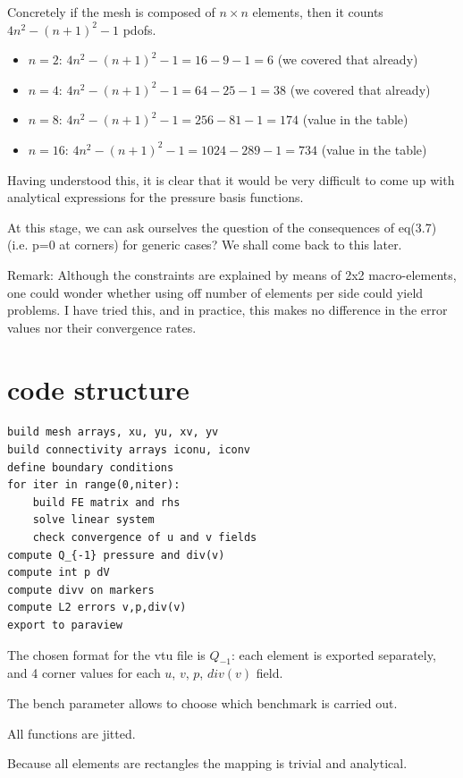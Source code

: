 Concretely if the mesh is composed of $n \times n$ elements, then it 
counts $4n^2 - (n+1)^2  -1$ pdofs.
\begin{itemize}
\item $n=2$:  $4n^2 - (n+1)^2 -1= 16 -9 -1=6 $ (we covered that already)
\item $n=4$:  $4n^2 - (n+1)^2 -1= 64 -25 -1=38 $ (we covered that already)
\item $n=8$:  $4n^2 - (n+1)^2 -1= 256 -81 -1=174 $ (value in the table)
\item $n=16$: $4n^2 - (n+1)^2 -1= 1024 -289 -1= 734$ (value in the table)
\end{itemize}

Having understood this, it is clear that it would be very difficult 
to come up with analytical expressions for the pressure basis functions. 

At this stage, we can ask ourselves the question of the consequences of eq(3.7) (i.e. p=0 at corners) 
for generic cases? We shall come back to this later.

Remark: Although the constraints are explained by means of 2x2 macro-elements, 
one could wonder whether using off number of elements per side could yield problems.
I have tried this, and in practice, this makes no difference in the error values nor their 
convergence rates.


\section*{code structure}

\begin{verbatim}
build mesh arrays, xu, yu, xv, yv
build connectivity arrays iconu, iconv
define boundary conditions
for iter in range(0,niter):
    build FE matrix and rhs
    solve linear system
    check convergence of u and v fields
compute Q_{-1} pressure and div(v)
compute int p dV
compute divv on markers
compute L2 errors v,p,div(v)
export to paraview
\end{verbatim}
The chosen format for the vtu file is $Q_{-1}$: each element
is exported separately, and 4 corner values for 
each $u$, $v$, $p$, $div(v)$ field.

The {\python bench} parameter allows to choose 
which benchmark is carried out.

All functions are jitted.

Because all elements are rectangles the mapping is trivial
and analytical. 

